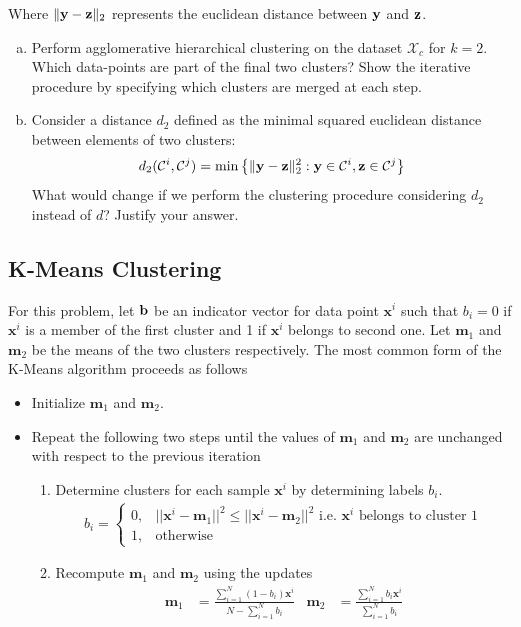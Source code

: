 \documentclass[11pt,a4paper]{article}
\begin{document}
Where $\|{\bf y}-{\bf z}\|_2$ represents the euclidean distance between $\bf y$ and $\bf z$.
\begin{enumerate}[(a)]
	\item Perform agglomerative hierarchical clustering on the dataset $\mathcal{X}_c$ for $k=2$. Which data-points are part of the final two clusters? Show the iterative procedure by specifying which clusters are merged at each step.
	\item Consider a distance $d_2$ defined as the minimal squared euclidean distance between elements of two clusters:
	\begin{align*}
	d_{2}(\mathcal{C}^i, \mathcal{C}^j) = \min \left\{ \|{\bf y}-{\bf z}\|_2^2 : {\bf y}\in\mathcal{C}^i, {\bf z}\in\mathcal{C}^j \right\}
	\end{align*}
	What would change if we perform the clustering procedure considering $d_2$ instead of $d$? Justify your answer.
\end{enumerate}

\subsection{K-Means Clustering}
 For this problem, let $\bf b$ be an indicator vector for data point $\textbf{x}^i$ such that $b_{i} = 0$ if $\textbf{x}^i$ is a member of the first cluster and 1 if $\textbf{x}^i$ belongs to second one. Let $\textbf{m}_1$ and $\textbf{m}_2$ be the means of the two clusters respectively.
The most common form of the K-Means algorithm proceeds as follows

\begin{itemize}
\item {Initialize $\textbf{m}_1$ and $\textbf{m}_2$.}

\item Repeat the following two steps until the values of $\textbf{m}_1$ and $\textbf{m}_2$ are unchanged with respect to the previous iteration

\begin{enumerate}
\item Determine clusters for each sample $\textbf{x}^i$ by determining labels $b_i$.
\begin{align*}
b_i =
\begin{cases}
0,& ||\textbf{x}^i - \textbf{m}_1||^2 \le ||\textbf{x}^i - \textbf{m}_{2}||^2  \text{ i.e. $\textbf{x}^i$ belongs to cluster 1} \\
1, & \text{otherwise}
\end{cases}
\end{align*}

\item {Recompute $\textbf{m}_1$ and $\textbf{m}_2$ using the updates
\begin{align*}
\textbf{m}_{1} &= \frac{\sum_{i=1}^N (1-b_i) \textbf{x}^i}{N-\sum_{i=1}^N b_i} & \textbf{m}_{2} &= \frac{\sum_{i=1}^N b_i \textbf{x}^i}{\sum_{i=1}^N b_i}
\end{align*}}

\end{enumerate}
\end{itemize}
\end{document}
